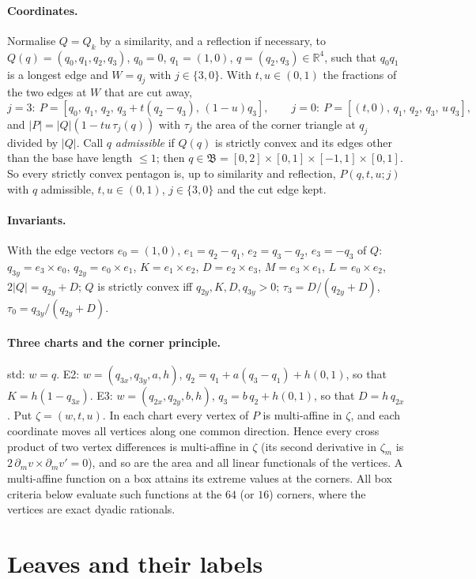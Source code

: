 \documentclass[11pt]{article}
\theoremstyle{remark}
\newcommand{\R}{\mathbb{R}}
\begin{document}
\paragraph{Coordinates.} Normalise $Q=Q_k$ by a similarity, and a reflection if necessary, to
$Q(q)=(q_0,q_1,q_2,q_3)$, $q_0=0$, $q_1=(1,0)$, $q=(q_2,q_3)\in\R^4$, such that $q_0q_1$ is a longest edge and $W=q_j$ with
$j\in\{3,0\}$. With $t,u\in(0,1)$ the fractions of the two edges at $W$ that are cut away,
\[
j=3:\ P=[q_0,\,q_1,\,q_2,\,q_3+t(q_2-q_3),\,(1-u)q_3],\qquad j=0:\ P=[(t,0),\,q_1,\,q_2,\,q_3,\,u\,q_3],
\]
and $|P|=|Q|(1-tu\,\tau_j(q))$ with $\tau_j$ the area of the corner triangle at $q_j$ divided by $|Q|$. Call $q$
\emph{admissible} if $Q(q)$ is strictly convex and its edges other than the base have length $\le1$; then
$q\in\mathfrak B=[0,2]\times[0,1]\times[-1,1]\times[0,1]$. So every strictly convex pentagon is, up to similarity and
reflection, $P(q,t,u;j)$ with $q$ admissible, $t,u\in(0,1)$, $j\in\{3,0\}$ and the cut edge kept.

\paragraph{Invariants.} With the edge vectors $e_0=(1,0)$, $e_1=q_2-q_1$, $e_2=q_3-q_2$, $e_3=-q_3$ of $Q$:
$q_{3y}=e_3\times e_0$, $q_{2y}=e_0\times e_1$, $K=e_1\times e_2$, $D=e_2\times e_3$, $M=e_3\times e_1$, $L=e_0\times e_2$,
$2|Q|=q_{2y}+D$; $Q$ is strictly convex iff $q_{2y},K,D,q_{3y}>0$; $\tau_3=D/(q_{2y}+D)$, $\tau_0=q_{3y}/(q_{2y}+D)$.

\paragraph{Three charts and the corner principle.} std: $w=q$. E2: $w=(q_{3x},q_{3y},a,h)$, $q_2=q_1+a(q_3-q_1)+h(0,1)$,
so that $K=h(1-q_{3x})$. E3: $w=(q_{2x},q_{2y},b,h)$, $q_3=b\,q_2+h(0,1)$, so that $D=h\,q_{2x}$. Put $\zeta=(w,t,u)$. In
each chart every vertex of $P$ is multi-affine in $\zeta$, and each coordinate moves all vertices along one common
direction. Hence every cross product of two vertex differences is multi-affine in $\zeta$ (its second derivative in
$\zeta_m$ is $2\,\partial_mv\times\partial_mv'=0$), and so are the area and all linear functionals of the vertices.
A multi-affine function on a box attains its extreme values at the corners. All box criteria below evaluate such
functions at the $64$ (or $16$) corners, where the vertices are exact dyadic rationals.

\section{Leaves and their labels}\label{sec:labels}
\end{document}
